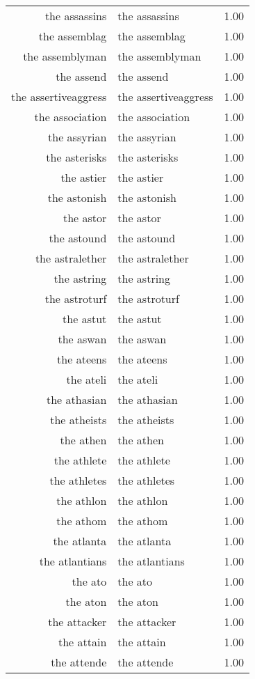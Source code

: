 \begin{table}[ht]
\begin{tabular}{rlr}
  the assassins & the assassins & 1.00 \\ 
  the assemblag & the assemblag & 1.00 \\ 
  the assemblyman & the assemblyman & 1.00 \\ 
  the assend & the assend & 1.00 \\ 
  the assertiveaggress & the assertiveaggress & 1.00 \\ 
  the association & the association & 1.00 \\ 
  the assyrian & the assyrian & 1.00 \\ 
  the asterisks & the asterisks & 1.00 \\ 
  the astier & the astier & 1.00 \\ 
  the astonish & the astonish & 1.00 \\ 
  the astor & the astor & 1.00 \\ 
  the astound & the astound & 1.00 \\ 
  the astralether & the astralether & 1.00 \\ 
  the astring & the astring & 1.00 \\ 
  the astroturf & the astroturf & 1.00 \\ 
  the astut & the astut & 1.00 \\ 
  the aswan & the aswan & 1.00 \\ 
  the ateens & the ateens & 1.00 \\ 
  the ateli & the ateli & 1.00 \\ 
  the athasian & the athasian & 1.00 \\ 
  the atheists & the atheists & 1.00 \\ 
  the athen & the athen & 1.00 \\ 
  the athlete & the athlete & 1.00 \\ 
  the athletes & the athletes & 1.00 \\ 
  the athlon & the athlon & 1.00 \\ 
  the athom & the athom & 1.00 \\ 
  the atlanta & the atlanta & 1.00 \\ 
  the atlantians & the atlantians & 1.00 \\ 
  the ato & the ato & 1.00 \\ 
  the aton & the aton & 1.00 \\ 
  the attacker & the attacker & 1.00 \\ 
  the attain & the attain & 1.00 \\ 
  the attende & the attende & 1.00 \\ 

\end{tabular}
\end{table}

